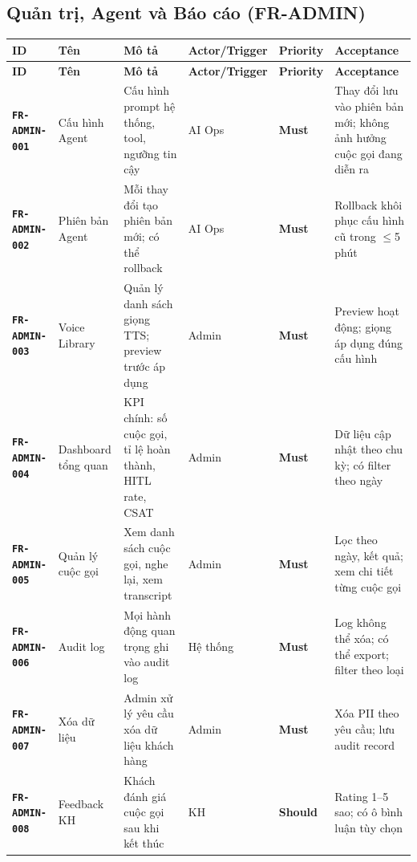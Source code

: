\documentclass[12pt,a4paper]{article}
\newcommand{\reqid}[1]{\texttt{\textbf{\color{AloBlue}#1}}}
\newcommand{\musthave}{\colorbox{PrioMust}{\small\textbf{Must}}}
\newcommand{\shouldhave}{\colorbox{PrioShould}{\small\textbf{Should}}}
\begin{document}
\subsection{Quản trị, Agent và Báo cáo (FR-ADMIN)}
\begin{longtable}{L{2.2cm} L{2.2cm} L{3.8cm} L{2.8cm} C{1.5cm} L{3cm}}
  \toprule{}\textbf{ID}&\textbf{Tên}&\textbf{Mô tả}&\textbf{Actor/Trigger}&\textbf{Priority}&\textbf{Acceptance}\\
  \midrule\endfirsthead\toprule{}\textbf{ID}&\textbf{Tên}&\textbf{Mô tả}&\textbf{Actor/Trigger}&\textbf{Priority}&\textbf{Acceptance}\\\midrule\endhead\bottomrule\endlastfoot
  \reqid{FR-ADMIN-001} & Cấu hình Agent & Cấu hình prompt hệ thống, tool, ngưỡng tin cậy & AI Ops & \musthave & Thay đổi lưu vào phiên bản mới; không ảnh hưởng cuộc gọi đang diễn ra \\
  \reqid{FR-ADMIN-002} & Phiên bản Agent & Mỗi thay đổi tạo phiên bản mới; có thể rollback & AI Ops & \musthave & Rollback khôi phục cấu hình cũ trong $\leq$5 phút \\
  \reqid{FR-ADMIN-003} & Voice Library & Quản lý danh sách giọng TTS; preview trước áp dụng & Admin & \musthave & Preview hoạt động; giọng áp dụng đúng cấu hình \\
  \reqid{FR-ADMIN-004} & Dashboard tổng quan & KPI chính: số cuộc gọi, tỉ lệ hoàn thành, HITL rate, CSAT & Admin & \musthave & Dữ liệu cập nhật theo chu kỳ; có filter theo ngày \\
  \reqid{FR-ADMIN-005} & Quản lý cuộc gọi & Xem danh sách cuộc gọi, nghe lại, xem transcript & Admin & \musthave & Lọc theo ngày, kết quả; xem chi tiết từng cuộc gọi \\
  \reqid{FR-ADMIN-006} & Audit log & Mọi hành động quan trọng ghi vào audit log & Hệ thống & \musthave & Log không thể xóa; có thể export; filter theo loại \\
  \reqid{FR-ADMIN-007} & Xóa dữ liệu & Admin xử lý yêu cầu xóa dữ liệu khách hàng & Admin & \musthave & Xóa PII theo yêu cầu; lưu audit record \\
  \reqid{FR-ADMIN-008} & Feedback KH & Khách đánh giá cuộc gọi sau khi kết thúc & KH & \shouldhave & Rating 1--5 sao; có ô bình luận tùy chọn \\
\end{longtable}
\end{document}
